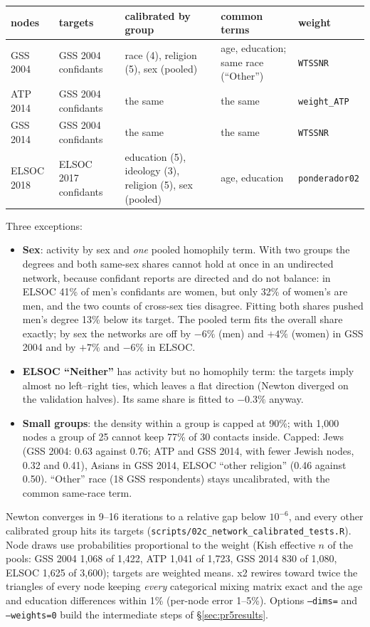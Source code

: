 \documentclass[11pt,a4paper]{article}
\newcommand{\code}[1]{\texttt{#1}}
\begin{document}
\begin{center}
\footnotesize
\setlength{\tabcolsep}{4pt}
\begin{tabular}{@{}ll>{\raggedright\arraybackslash}p{4.6cm}>{\raggedright\arraybackslash}p{3.2cm}l@{}}
\toprule
nodes & targets & calibrated by group & common terms & weight \\
\midrule
GSS 2004 & GSS 2004 confidants & race (4), religion (5), sex (pooled) & age, education; same race (``Other'') & \code{WTSSNR} \\
ATP 2014 & GSS 2004 confidants & the same & the same & \code{weight\_ATP} \\
GSS 2014 & GSS 2004 confidants & the same & the same & \code{WTSSNR} \\
ELSOC 2018 & ELSOC 2017 confidants & education (5), ideology (3), religion (5), sex (pooled) & age, education & \code{ponderador02} \\
\bottomrule
\end{tabular}
\end{center}

\noindent Three exceptions:
\begin{itemize}
  \item \textbf{Sex}: activity by sex and \emph{one} pooled homophily term. With two groups the degrees
    and both same-sex shares cannot hold at once in an undirected network, because confidant reports
    are directed and do not balance: in ELSOC 41\% of men's confidants are women, but only 32\% of
    women's are men, and the two counts of cross-sex ties disagree. Fitting both shares pushed men's
    degree 13\% below its target. The pooled term fits the overall share exactly; by sex the networks
    are off by $-6\%$ (men) and $+4\%$ (women) in GSS 2004 and by $+7\%$ and $-6\%$ in ELSOC.
  \item \textbf{ELSOC ``Neither''} has activity but no homophily term: the targets imply almost no
    left--right ties, which leaves a flat direction (Newton diverged on the validation halves). Its
    same share is fitted to $-0.3\%$ anyway.
  \item \textbf{Small groups}: the density within a group is capped at 90\%; with 1{,}000 nodes a group
    of 25 cannot keep 77\% of 30 contacts inside. Capped: Jews (GSS 2004: 0.63 against 0.76; ATP and
    GSS 2014, with fewer Jewish nodes, 0.32 and 0.41), Asians in GSS 2014, ELSOC ``other religion''
    (0.46 against 0.50). ``Other'' race (18 GSS respondents) stays uncalibrated, with the common
    same-race term.
\end{itemize}
Newton converges in 9--16 iterations to a relative gap below $10^{-6}$, and every other calibrated group
hits its targets (\code{scripts/02c\_network\_calibrated\_tests.R}). Node draws use probabilities
proportional to the weight (Kish effective $n$ of the pools: GSS 2004 1{,}068 of 1{,}422, ATP 1{,}041 of
1{,}723, GSS 2014 830 of 1{,}080, ELSOC 1{,}625 of 3{,}600); targets are weighted means. x2 rewires toward
twice the triangles of every node keeping \emph{every} categorical mixing matrix exact and the age and
education differences within 1\% (per-node error 1--5\%). Options \code{--dims=} and \code{--weights=0}
build the intermediate steps of \S\ref{sec:pr5results}.
\end{document}
